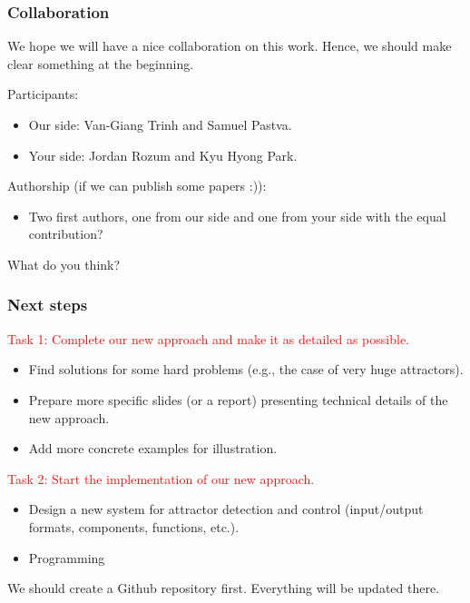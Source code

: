 \documentclass{beamer}              %
\newcommand{\red}[1]{\textcolor{red}{#1}}
\begin{document}
\begin{frame}
\frametitle{Collaboration}

We hope we will have a nice collaboration on this work.
Hence, we should make clear something at the beginning.

\hspace{0.8cm}

Participants:
\begin{itemize}
  \item Our side: Van-Giang Trinh and Samuel Pastva.
  \item Your side: Jordan Rozum and Kyu Hyong Park.
\end{itemize}

\hspace{0.8cm}

Authorship (if we can publish some papers :)): 
\begin{itemize}
  \item Two first authors, one from our side and one from your side with the equal contribution?
\end{itemize}

\hspace{0.8cm}

What do you think?

\end{frame}

\begin{frame}
\frametitle{Next steps}

\red{Task 1: Complete our new approach and make it as detailed as possible.}
\begin{itemize}
  \item Find solutions for some hard problems (e.g., the case of very huge attractors).
  \item Prepare more specific slides (or a report) presenting technical details of the new approach.
  \item Add more concrete examples for illustration.
\end{itemize}

\hspace{0.8cm}

\red{Task 2: Start the implementation of our new approach.}
\begin{itemize}
  \item Design a new system for attractor detection and control (input/output formats, components, functions, etc.).
  \item Programming
\end{itemize}

\hspace{0.8cm}

We should create a Github repository first.
Everything will be updated there.
\end{frame}
\end{document}
